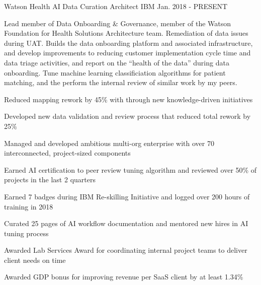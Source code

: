 

\begin{cventries}

  \cventry
    {Watson Health} %
    {AI Data Curation Architect} %
    {IBM} %
    {Jan. 2018 - PRESENT} %
    {
      \begin{cvparagraph}
        Lead member of Data Onboarding \& Governance, member of the Watson Foundation for Health Solutions Architecture team.  Remediation of data issues during UAT.  Builds the data onboarding platform and associated infrastructure, and develop improvements to reducing customer implementation cycle time and data triage activities, and report on the “health of the data” during data onboarding.  Tune machine learning classificiation algorithms for patient matching, and the perform the internal review of similar work by my peers.
      \end{cvparagraph}
      \begin{cvitems} %
        \item {Reduced mapping rework by 45\% with through new knowledge-driven initiatives}
        \item {Developed new data validation and review process that reduced total rework by 25\%}
        \item {Managed and developed ambitious multi-org enterprise with over 70 interconnected, project-sized components}
        \item {Earned AI certification to peer review tuning algorithm and reviewed over 50\% of projects in the last 2 quarters}
        \item {Earned 7 badges during IBM Re-skilling Initiative and logged over 200 hours of training in 2018}
        \item {Curated 25 pages of AI workflow documentation and mentored new hires in AI tuning process}
        \item {Awarded Lab Services Award for coordinating internal project teams to deliver client needs on time}
        \item {Awarded GDP bonus for improving revenue per SaaS client by at least 1.34\%}
      \end{cvitems}
    }


\end{cventries}
